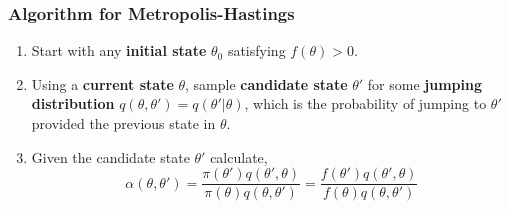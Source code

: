 \subsubsection{Algorithm for Metropolis-Hastings}
\begin{enumerate}
	\item Start with any \textbf{initial state}  $ \theta_0 $ satisfying $ f(\theta) > 0 $.
	\item Using a \textbf{current state}  $ \theta $, sample \textbf{candidate state} $ \theta' $ for some \textbf{jumping distribution} $ q(\theta, \theta') = q(\theta'|\theta) $, which is the probability of jumping to $ \theta' $ provided the previous state in $ \theta $.
	\item Given the candidate state $ \theta' $ calculate,
        \[
            \alpha(\theta,\theta') = \frac{\pi(\theta')q(\theta', \theta)}{\pi(\theta)q(\theta, \theta')} = \frac{f(\theta')q(\theta', \theta)}{f(\theta)q(\theta, \theta')}
        \]
\end{enumerate}
